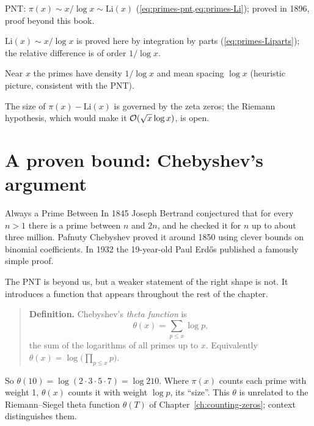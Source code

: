 \begin{keyideas}
\item PNT: $\pi(x)\sim x/\log x\sim\mathrm{Li}(x)$ (\cref{eq:primes-pnt,eq:primes-Li}); proved in 1896, proof beyond this book.
\item $\mathrm{Li}(x)\sim x/\log x$ is proved here by integration by parts (\cref{eq:primes-Liparts}); the relative difference is of order $1/\log x$.
\item Near $x$ the primes have density $1/\log x$ and mean spacing $\log x$ (heuristic picture, consistent with the PNT).
\item The size of $\pi(x)-\mathrm{Li}(x)$ is governed by the zeta zeros; the Riemann hypothesis, which would make it $\mathcal{O}(\sqrt x\log x)$, is open.
\end{keyideas}

\section{A proven bound: Chebyshev's argument}\label{sec:primes-chebyshev}
\begin{didyouknow}{Always a Prime Between}
In 1845 Joseph Bertrand conjectured that for every $n>1$ there is a prime between $n$ and $2n$, and he checked it for $n$ up to about three million. Pafnuty Chebyshev proved it around 1850 using clever bounds on binomial coefficients. In 1932 the 19-year-old Paul Erd\H{o}s published a famously simple proof.
\end{didyouknow}

The PNT is beyond us, but a weaker statement of the right shape is not. It introduces a function that appears throughout the rest of the chapter.

\begin{quote}
\textbf{Definition.} Chebyshev's \emph{theta function} is
\begin{equation}
\theta(x)=\sum_{p\le x}\log p ,
\label{eq:primes-theta}
\end{equation}
the sum of the logarithms of all primes up to $x$. Equivalently $\theta(x)=\log\bigl(\prod_{p\le x}p\bigr)$.
\end{quote}

So $\theta(10)=\log(2\cdot3\cdot5\cdot7)=\log210$. Where $\pi(x)$ counts each prime with weight 1, $\theta(x)$ counts it with weight $\log p$, its ``size''. This $\theta$ is unrelated to the Riemann--Siegel theta function $\theta(T)$ of Chapter~\ref{ch:counting-zeros}; context distinguishes them.

